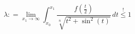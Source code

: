 \begin{equation}
    \lambda \mathrel{\mathop:}= \lim_{x_1 \to \infty}
    \int_{x_0}^{x_1}
    \frac{f(\frac{t}{2})}{\sqrt[n]{t^2 + \sin^2(t)}}
    \, dt \stackrel{!}{\leq} 1
\end{equation}\label{eqn:example}
